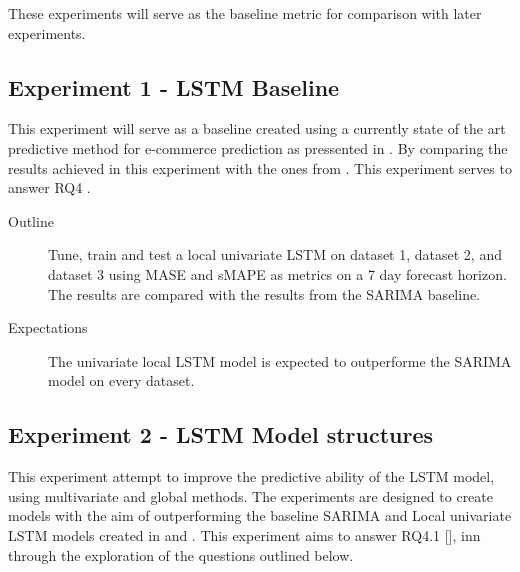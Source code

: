These experiments will serve as the baseline metric for comparison with later experiments.




\subsection{Experiment 1 - LSTM Baseline}
\label{section:results:experimentPlan:Experiment-1}
This experiment will serve as a baseline created using a currently state of the art predictive method
for e-commerce prediction as pressented in .
By comparing the results achieved in this experiment with the ones from .
This experiment serves to answer RQ4 .

\begin{description}
  \item[Outline]{
              Tune, train and test a local univariate LSTM on dataset 1,
              dataset 2, and dataset 3 using MASE and sMAPE as metrics on a 7 day forecast horizon.
              The results are compared with the results from the SARIMA baseline. }
\end{description}

\begin{description}
  \item[Expectations]{
              The univariate local LSTM model is expected to outperforme the SARIMA model on every dataset.
        }
\end{description}




\subsection{Experiment 2 - LSTM Model structures}
\label{section:results:experimentPlan:Experiment-2}
This experiment attempt to improve the predictive ability of the LSTM model,
using multivariate and global methods.
The experiments are designed to create models with the aim of outperforming the baseline
SARIMA and Local univariate LSTM models created in  and .
This experiment aims to answer RQ4.1 [],
inn through the exploration of the questions outlined below.

